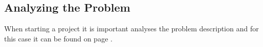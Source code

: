 \subsection{Analyzing the Problem}
When starting a project it is important analyses the problem description and for this case it can be found on page \pageref{sc:problemdescription}.